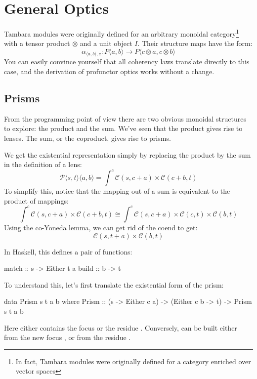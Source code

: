 \documentclass[DaoFP]{subfiles}
\begin{document}
\section{General Optics}
Tambara modules were originally defined for an arbitrary monoidal category\footnote{In fact, Tambara modules were originally defined for a category enriched over vector spaces} with a tensor product $\otimes$ and a unit object $I$. Their structure maps have the form:
\[ \alpha_{\langle a, b\rangle, c} \colon P \langle a, b \rangle \to P \langle c \otimes a, c \otimes b \rangle \]
You can easily convince yourself that all coherency laws translate directly to this case, and the derivation of profunctor optics works without a change.

\subsection{Prisms}

From the programming point of view there are two obvious monoidal structures to explore: the product and the sum. We've seen that the product gives rise to lenses. The sum, or the coproduct, gives rise to prisms. 

We get the existential representation simply by replacing the product by the sum in the definition of a lens:
\[ \mathcal{P}\langle s, t\rangle \langle a, b \rangle = \int^{c} \mathcal{C}(s, c + a) \times  \mathcal{C}(c + b, t) \]
To simplify this, notice that the mapping out of a sum is equivalent to the product of mappings:
\[ \int^{c} \mathcal{C}(s, c + a) \times  \mathcal{C}(c + b, t) \cong  \int^{c} \mathcal{C}(s, c + a) \times  \mathcal{C}(c, t) \times  \mathcal{C}(b, t) \]
Using the co-Yoneda lemma, we can get rid of the coend to get:
\[ \mathcal{C}(s, t + a) \times  \mathcal{C}(b, t) \]

In Haskell, this defines a pair of functions:
\begin{haskell}
match :: s -> Either t a
build :: b -> t
\end{haskell}

To understand this, let's first translate the existential form of the prism:
\begin{haskell}
data Prism s t a b where
  Prism :: (s -> Either c a) -> (Either c b -> t) -> Prism s t a b
\end{haskell}
Here  either contains the focus  or the residue . Conversely,  can be built either from the new focus , or from the residue . 
\end{document}
